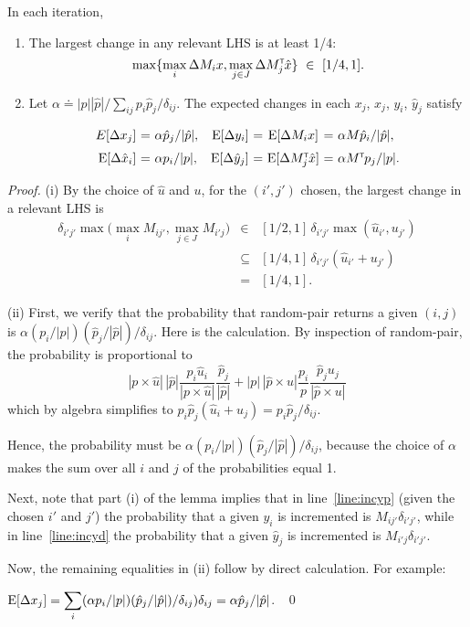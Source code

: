 \documentclass[11pt]{svjour3} \usepackage{fullpage}
\newcommand{\primalOf}[1]{{{#1}}}
\newcommand{\dualOf}[1]{{\hat{#1}}}
\newcommand{\MM}{M}
\newcommand{\JJ}{J}
\newcommand{\xp}{\primalOf x}
\newcommand{\yp}{\primalOf y}
\newcommand{\pp}{\primalOf p}
\newcommand{\wwp}{\primalOf u}
\newcommand{\xd}{\dualOf x}
\newcommand{\yd}{\dualOf y}
\newcommand{\pd}{\dualOf p}
\newcommand{\wwd}{\dualOf u}
\newcommand{\dd}{\delta}
\newenvironment{Proof}{\begin{proof}}{{} ~\hfill\hfill\qed~\end{proof}}
\newcommand{\algfont}{}
\newcommand{\tran}{^{\scriptscriptstyle \sf T\hspace*{-0.05em}}}
\newcommand{\E}{{\rm E}}
\begin{document}
\begin{lemma}\label{lemma:facts}
In each iteration, 
\begin{enumerate}
\item 
The largest change in any relevant LHS is at least 1/4:
\[\max\{\max_{i} \Delta \MM_{i} \xp, \max_{j\in \JJ} \Delta \MM\tran_{j} \xd\}
~\in~ [1/4,1].\]

\item Let $\alpha\doteq |\pp||\pd|/\sum_{ij} \pp_i\pd_j/\dd_{ij}$.
The expected changes in each $\xp_j$, $\xp_j$, $\yp_i$, $\yd_j$ satisfy

\[
\begin{array}{r@{~}c@{~}lr@{~}c@{~}c@{~}c@{~}l}
E[\Delta \xp_j] & = & \alpha \pd_j/|\pd|,
& \E[\Delta \yp_i] & = & \E[\Delta \MM_i \xp] & = & \alpha \MM\pd_i/|\pd|,
\\[6pt]
\E[\Delta \xd_i] &=& \alpha \pp_i/|\pp|,
& \E[\Delta \yd_j] &=& \E[\Delta \MM_j\tran \xd] &=& \alpha \MM\tran \pp_j/|\pp|.
\end{array}
\]
\end{enumerate}
\end{lemma}
\begin{Proof}
(i) By the choice of $\wwd$ and $\wwp$, for the $(i',j')$ chosen,
the largest change in a relevant LHS is
\begin{eqnarray*}
\delta_{i'j'}\max\big(
  \max_{i} \MM_{ij'}, 
  \max_{j\in \JJ} \MM_{i'j}\big)
&\in& [1/2,1]\,\dd_{i'j'} \max(\wwd_{i'}, \wwp_{j'})\\
&\subseteq& [1/4,1]\, \dd_{i'j'} (\wwd_{i'}+ \wwp_{j'})\\
&=& [1/4,1].
\end{eqnarray*}

\noindent
(ii) First, we verify that the probability that {\algfont random-pair} returns a given $(i,j)$ is 
$\alpha (\pp_{i}/|\pp|)(\pd_{j}/|\pd|)/\dd_{ij}$.
Here is the calculation.
By inspection of {\algfont random-pair}, the probability is proportional to
\[
|\pp\times\wwd|\,|\pd| 
\frac{\pp_{i}\wwd_{i}}{|\pp\times\wwd|}
\frac{\pd_{j}}{|\pd|}
+
|\pp|\,|\pd\times\wwp| 
\frac{\pp_{i}}{\pp}
\frac{\pd_{j}\wwp_{j}}{|\pd\times\wwp|}
\]
which by algebra simplifies to
$\pp_i\pd_j(\wwd_i+\wwp_j) = \pp_{i}\pd_{j}/\dd_{ij}$.

Hence, the probability must be $\alpha (\pp_{i}/|\pp|)(\pd_{j}/|\pd|)/\dd_{ij}$,
because the choice of $\alpha$ makes the sum over all $i$ and $j$ of the probabilities equal 1.

Next, note that part (i) of the lemma implies that in line~\ref{line:incyp} (given the chosen $i'$ and $j'$) the probability that a given $\yp_{i}$ is incremented is $\MM_{ij'}\dd_{i'j'}$, while in line~\ref{line:incyd} the probability that a given $\yd_{j}$ is incremented is $\MM_{i'j}\dd_{i'j'}$.

Now, the remaining equalities in (ii) follow by direct calculation.
For example:

\bigskip
\hfill
$\displaystyle\E[\Delta\xp_j] = \sum_{i} (\alpha \pp_{i}/|\pp|)(\pd_j/|\pd|)/\dd_{ij})\dd_{ij} = \alpha \pd_j/|\pd|$.
\hfill
\end{Proof}
\end{document}
